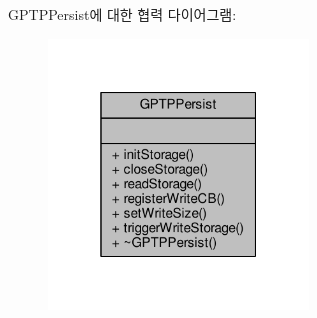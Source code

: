 G\+P\+T\+P\+Persist에 대한 협력 다이어그램\+:
\nopagebreak
\begin{figure}[H]
\begin{center}
\leavevmode
\includegraphics[width=196pt]{class_g_p_t_p_persist__coll__graph}
\end{center}
\end{figure}
